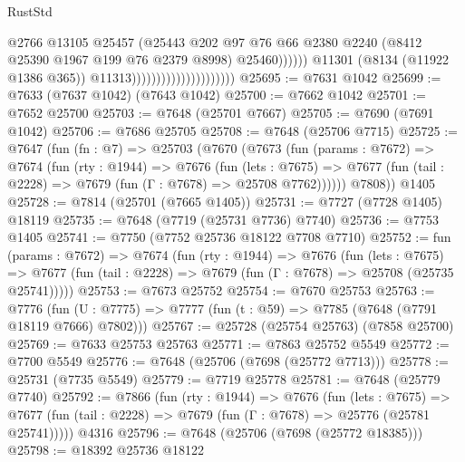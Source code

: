\begin{lexlean}{RustStd}
\begin{coremodule}
                                                        @2766
                                                        @13105
                                                        @25457
                                                        (@25443
                                                          @202
                                                          @97
                                                          @76
                                                          @66
                                                          @2380
                                                          @2240
                                                          (@8412 @25390 @1967 @199 @76 @2379 @8998)
                                                          @25460))))))
                                              @11301
                                              (@8134 (@11922 @1386 @365))
                                              @11313)))))))))))))))))))))
@25695 := @7631 @1042
@25699 := @7633 (@7637 @1042) (@7643 @1042)
@25700 := @7662 @1042
@25701 := @7652 @25700
@25703 := @7648 (@25701 @7667)
@25705 := @7690 (@7691 @1042)
@25706 := @7686 @25705
@25708 := @7648 (@25706 @7715)
@25725 := @7647
    (fun (fn : @7) =>
    @25703
      (@7670
        (@7673
          (fun (params : @7672) =>
          @7674
            (fun (rty : @1944) =>
            @7676
              (fun (lets : @7675) =>
              @7677 (fun (tail : @2228) => @7679 (fun (Γ : @7678) => @25708 @7762))))))
        @7808))
    @1405
@25728 := @7814 (@25701 (@7665 @1405))
@25731 := @7727 (@7728 @1405) @18119
@25735 := @7648 (@7719 (@25731 @7736) @7740)
@25736 := @7753 @1405
@25741 := @7750 (@7752 @25736 @18122 @7708 @7710)
@25752 := fun (params : @7672) =>
  @7674
    (fun (rty : @1944) =>
    @7676
      (fun (lets : @7675) =>
      @7677 (fun (tail : @2228) => @7679 (fun (Γ : @7678) => @25708 (@25735 @25741)))))
@25753 := @7673 @25752
@25754 := @7670 @25753
@25763 := @7776
    (fun (U : @7775) => @7777 (fun (t : @59) => @7785 (@7648 (@7791 @18119 @7666) @7802)))
@25767 := @25728 (@25754 @25763) (@7858 @25700)
@25769 := @7633 @25753 @25763
@25771 := @7863 @25752 @5549
@25772 := @7700 @5549
@25776 := @7648 (@25706 (@7698 (@25772 @7713)))
@25778 := @25731 (@7735 @5549)
@25779 := @7719 @25778
@25781 := @7648 (@25779 @7740)
@25792 := @7866
    (fun (rty : @1944) =>
    @7676
      (fun (lets : @7675) =>
      @7677 (fun (tail : @2228) => @7679 (fun (Γ : @7678) => @25776 (@25781 @25741)))))
    @4316
@25796 := @7648 (@25706 (@7698 (@25772 @18385)))
@25798 := @18392 @25736 @18122

\end{coremodule}
\end{lexlean}
